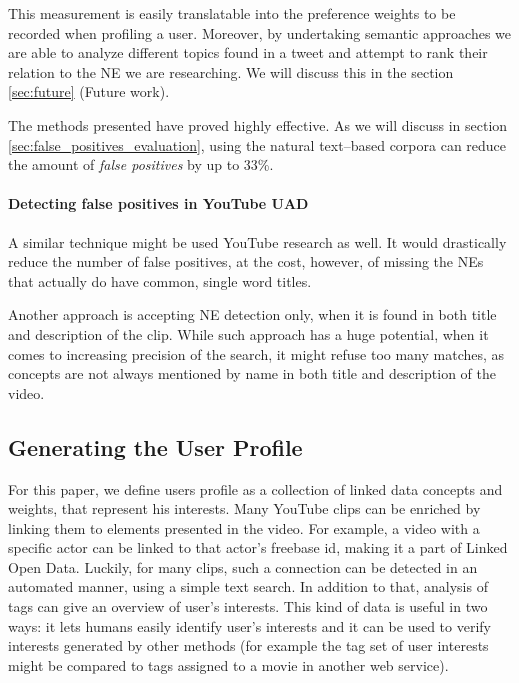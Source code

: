 This measurement is easily translatable into the preference weights to be recorded when profiling a user.
Moreover, by undertaking semantic approaches we are able to analyze different topics found in a tweet and
attempt to rank their relation to the NE we are researching. We will discuss this in the section \ref{sec:future}
(Future work).

The methods presented have proved highly effective. As we will discuss in section \ref{sec:false_positives_evaluation},
using the natural text--based corpora can reduce the amount of \textit{false positives} by up to 33\%.

\paragraph{Detecting false positives in YouTube UAD}

A similar technique might be used YouTube research as well. It would drastically
reduce the number of false positives, at the cost, however, of missing the NEs
that actually do have common, single word titles.

Another approach is accepting NE detection only, when it is found in both title
and description of the clip. While such approach has a huge potential, when it
comes to increasing precision of the search, it might refuse too many matches,
as concepts are not always mentioned by name in both title and description of
the video.

\subsection{Generating the User Profile}

For this paper, we define users profile as a collection of linked data concepts and weights,
that represent his interests. Many YouTube clips can be
enriched by linking them to elements presented in the video. For example, a
video with a specific actor can be linked to that actor's freebase id, making it
a part of Linked Open Data. Luckily, for many clips, such a connection can be
detected in an automated manner, using a simple text search.
In addition to that, analysis of tags can give an overview of user's interests. This kind of data is
useful in two ways: it lets humans easily identify user's interests and it can be
used to verify interests generated by other methods (for example the tag set
of user interests might be compared to tags assigned to a movie in another web
service).

